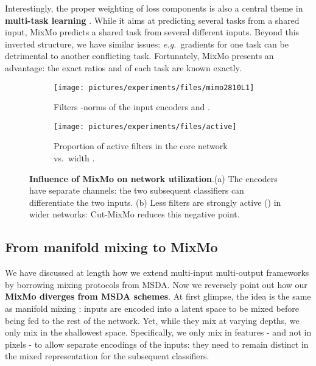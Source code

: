 \documentclass[10pt,twocolumn,letterpaper]{article}
\begin{document}
Interestingly, the proper weighting of loss components is also a central theme in \textbf{multi-task learning} \cite{caruana1997multitask,chen2018gradnorm,kendall2018multi,sener2018multi}. While it aims at predicting several
tasks from a shared input, MixMo predicts a shared task from several different inputs.
Beyond this inverted structure, we have similar issues: \textit{e.g.}\ gradients for one task can be detrimental to another conflicting task. Fortunately, MixMo presents an advantage: the exact ratios  and  of each task are known exactly.%
\begin{figure}
\centering
\begin{subfigure}[b]{0.48\columnwidth}
\centering
\texttt{[image: pictures/experiments/files/mimo2810L1]}
\caption{Filters -norms of the input encoders  and .}
\label{fig:mixmo_proj}
\end{subfigure}
\hfill \begin{subfigure}[b]{0.48\columnwidth}\centering \texttt{[image: pictures/experiments/files/active]}\caption{Proportion of active filters in the core network vs.\ width .}\label{fig:active_feats}\end{subfigure}\caption{\textbf{Influence of MixMo on network utilization}.\linebreak(a) The encoders have separate channels: the two subsequent classifiers can differentiate the two inputs. (b) Less filters are strongly active () in wider networks: Cut-MixMo reduces this negative point.}
\label{fig:proj_model}
\vspace{-0.5em}\end{figure}
%
 \vspace{-0.5em}
\subsection{From manifold mixing to MixMo}
\label{sec:msdamixmo}
We have discussed at length how we extend multi-input multi-output frameworks by
borrowing mixing protocols from MSDA. Now we reversely point out how
our \textbf{MixMo diverges from MSDA schemes}. At first glimpse, the idea is the
same as manifold mixing
\cite{faramarzi2020patchup,li2020n,manifoldmixup19}:  inputs
are encoded into a latent space to be mixed before being fed to the rest of the network.
Yet, while they mix at varying depths, we only mix in the shallowest space. Specifically, we only mix in features - and not in pixels - to allow separate encodings of the inputs: they need to remain distinct in the mixed representation for the subsequent classifiers.
\end{document}
